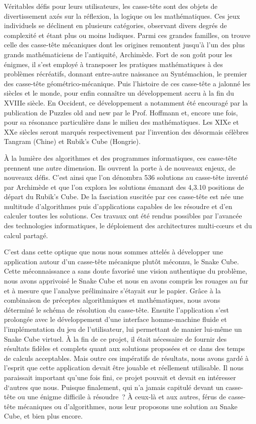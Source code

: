 Véritables défis pour leurs utilisateurs, les casse-tête sont des objets de divertissement axés sur la réflexion, la logique ou les mathématiques. Ces jeux individuels se déclinent en plusieurs catégories, observant divers degrés de complexité et étant plus ou moins ludiques. Parmi ces grandes familles, on trouve celle des casse-tête mécaniques dont les origines remontent jusqu’à l’un des plus grands mathématiciens de l’antiquité, Archimède. Fort de son goût pour les énigmes, il s’est employé à transposer les pratiques mathématiques à des problèmes récréatifs, donnant entre-autre naissance au Syntémachion, le premier des casse-tête géométrico-mécanique. Puis l’histoire de ces casse-tête a jalonné les siècles et le monde, pour enfin connaître un développement accru à la fin du XVIIIe siècle. En Occident, ce développement a notamment été encouragé par la publication de Puzzles old and new par le Prof. Hoffmann et, encore une fois, pour sa résonance particulière dans le milieu des mathématiques. Les XIXe et XXe siècles seront marqués respectivement par l’invention des désormais célèbres Tangram (Chine) et Rubik’s Cube (Hongrie).\newline

À la lumière des algorithmes et des programmes informatiques, ces casse-tête prennent une autre dimension. Ils ouvrent la porte à de nouveaux enjeux, de nouveaux défis. C’est ainsi que l’on dénombra 536 solutions au casse-tête inventé par Archimède et que l’on explora les solutions émanant des 4,3.10  positions de départ du Rubik’s Cube. De la fasciation suscitée par ces casse-tête est née une multitude d’algorithmes puis d’applications capables de les résoudre et d’en calculer toutes les solutions. Ces travaux ont été rendus possibles par l’avancée des technologies informatiques, le déploiement des architectures multi-cœurs et du calcul partagé.\newline

C’est dans cette optique que nous nous sommes attelés à développer une application autour d’un casse-tête mécanique plutôt méconnu, le Snake Cube. Cette méconnaissance a sans doute favorisé une vision authentique du problème, nous avons apprivoisé le Snake Cube et nous en avons compris les rouages au fur et à mesure que l’analyse préliminaire s’étayait sur le papier. Grâce à la combinaison de préceptes algorithmiques et mathématiques, nous avons déterminé le schéma de résolution du casse-tête. Ensuite l’application s’est prolongée avec le développement d’une interface homme-machine fluide et l’implémentation du jeu de l’utilisateur, lui permettant de manier lui-même un Snake Cube virtuel. À la fin de ce projet, il était nécessaire de fournir des résultats fidèles et complets quant aux solutions proposées et ce dans des temps de calculs acceptables. Mais outre ces impératifs de résultats, nous avons gardé à l’esprit que cette application devait être jouable et réellement utilisable. Il nous paraissait important qu’une fois fini, ce projet pouvait et devait en intéresser d‘autres que nous. Puisque finalement, qui n’a jamais capitulé devant un casse-tête ou une énigme difficile à résoudre ? À ceux-là et aux autres, férus de casse-tête mécaniques ou d’algorithmes, nous leur proposons une solution au Snake Cube, et bien plus encore.
